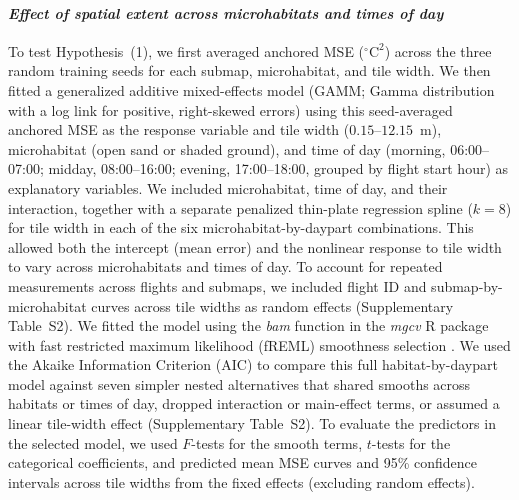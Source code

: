 \documentclass[12pt]{article}
\begin{document}
\paragraph*{\textit{Effect of spatial extent across microhabitats and times of day}}
To test Hypothesis~(1), we first averaged anchored MSE ($^{\circ}\mathrm{C}^2$) across the three random training seeds for each submap, microhabitat, and tile width. We then fitted a generalized additive mixed-effects model (GAMM; Gamma distribution with a log link for positive, right-skewed errors) using this seed-averaged anchored MSE as the response variable and tile width ($0.15$--$12.15$~m), microhabitat (open sand or shaded ground), and time of day (morning, 06:00--07:00; midday, 08:00--16:00; evening, 17:00--18:00, grouped by flight start hour) as explanatory variables. We included microhabitat, time of day, and their interaction, together with a separate penalized thin-plate regression spline ($k = 8$) for tile width in each of the six microhabitat-by-daypart combinations. This allowed both the intercept (mean error) and the nonlinear response to tile width to vary across microhabitats and times of day. To account for repeated measurements across flights and submaps, we included flight ID and submap-by-microhabitat curves across tile widths as random effects (Supplementary Table~S2). We fitted the model using the \textit{bam} function in the \textit{mgcv} R package with fast restricted maximum likelihood (fREML) smoothness selection \citep{mgcv_2011, R_Core_Team}. We used the Akaike Information Criterion (AIC) to compare this full habitat-by-daypart model against seven simpler nested alternatives that shared smooths across habitats or times of day, dropped interaction or main-effect terms, or assumed a linear tile-width effect (Supplementary Table~S2). To evaluate the predictors in the selected model, we used $F$-tests for the smooth terms, $t$-tests for the categorical coefficients, and predicted mean MSE curves and 95\% confidence intervals across tile widths from the fixed effects (excluding random effects).
\end{document}
